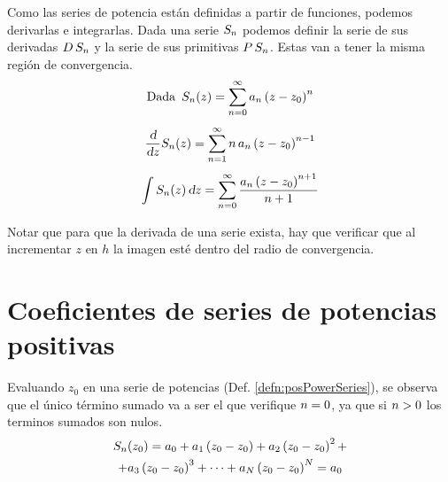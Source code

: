 Como las series de potencia están definidas a partir de funciones, podemos derivarlas e integrarlas.
Dada una serie $S_n$ podemos definir la serie de sus derivadas $D \, S_n$ y la serie de sus primitivas $P \, S_n$.
Estas van a tener la misma región de convergencia.
\begin{gather*}
    \textrm{Dada} \enspace S_n(z) = \sum_{n=0}^\infty a_n \left(z-z_0\right)^n
    \\[1ex]
    \frac{\textsl{d}}{\textsl{d} z} S_n(z) = \sum_{n=1}^\infty n \, a_n \left(z-z_0\right)^{n-1}
    \\[1ex]
    \int S_n(z) \, \textsl{d} z = \sum_{n=0}^\infty \frac{a_n \left(z-z_0\right)^{n+1}}{n+1}
\end{gather*}

Notar que para que la derivada de una serie exista, hay que verificar que al incrementar $z$ en $h$ la imagen esté dentro del radio de convergencia.


\section{Coeficientes de series de potencias positivas}

Evaluando $z_0$ en una serie de potencias (Def. \ref{defn:posPowerSeries}), se observa que el único término sumado va a ser el que verifique $n=0$, ya que si $n>0$ los terminos sumados son nulos.
\begin{multline*}
    S_n(z_0) = a_0 + a_1 \left(z_0-z_0\right) + a_2 \left(z_0-z_0\right)^2 +
    \\
    + a_3 \left(z_0-z_0\right)^3 + \dots + a_N \left(z_0-z_0\right)^N = a_0
\end{multline*}

